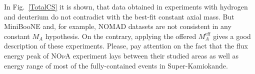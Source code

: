 In Fig.~\ref{TotalCS} it is shown, that data obtained in experiments with hydrogen and deuterium do not contradict with the best-fit constant axial mass. But MiniBooNE and, for example, NOMAD datasets are not consistent in any constant $M_{A}$ hypothesis. On the contrary, applying the offered $M_{A}^\mathrm{eff}$ gives a good description of these experiments. Please, pay attention on the fact that the flux energy peak of NO$\nu$A experiment lays between their studied areas as well as energy range of most of the fully-contained events in Super-Kamiokande.
